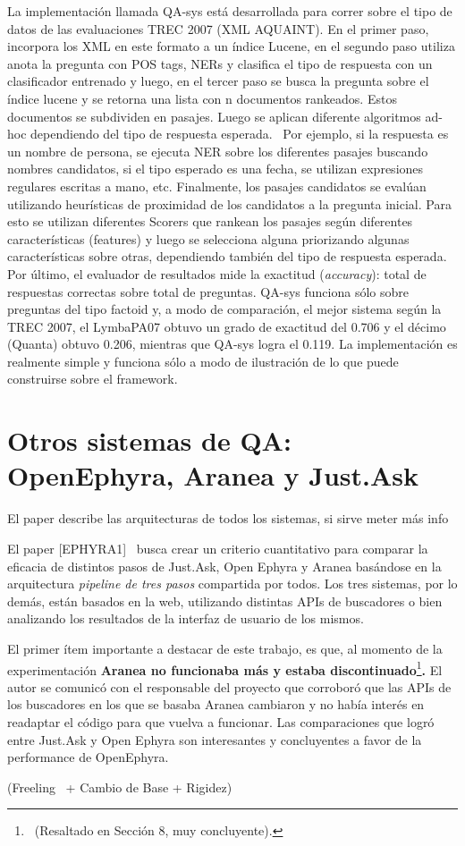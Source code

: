 La implementaci\'on llamada QA-sys est\'a desarrollada para correr sobre
el tipo de datos de las evaluaciones TREC 2007 (XML AQUAINT). En el
primer paso, incorpora los XML en este formato a un \'indice Lucene, en
el segundo paso utiliza anota la pregunta con POS tags, NERs y
clasifica el tipo de respuesta con un clasificador entrenado y luego,
en el tercer paso se busca la pregunta sobre el \'indice lucene y se
retorna una lista con n documentos rankeados. Estos documentos se
subdividen en pasajes. Luego se aplican diferente algoritmos ad-hoc
dependiendo del tipo de respuesta esperada. \ Por ejemplo, si la
respuesta es un nombre de persona, se ejecuta NER sobre los diferentes
pasajes buscando nombres candidatos, si el tipo esperado es una fecha,
se utilizan expresiones regulares escritas a mano, etc. Finalmente, los
pasajes candidatos se eval\'uan utilizando heur\'isticas de proximidad
de los candidatos a la pregunta inicial. Para esto se utilizan
diferentes Scorers que rankean los pasajes seg\'un diferentes
caracter\'isticas (features) y luego se selecciona alguna priorizando
algunas caracter\'isticas sobre otras, dependiendo tambi\'en del tipo
de respuesta esperada. Por \'ultimo, el evaluador de resultados mide la
exactitud (\textit{accuracy}): total de respuestas correctas sobre
total de preguntas. QA-sys funciona s\'olo sobre preguntas del tipo
factoid y, a modo de comparaci\'on, el mejor sistema seg\'un la TREC
2007, el LymbaPA07 obtuvo un grado de exactitud del 0.706 y el d\'ecimo
(Quanta) obtuvo 0.206, mientras que QA-sys logra el 0.119. La
implementaci\'on es realmente simple y funciona s\'olo a modo de
ilustraci\'on de lo que puede construirse sobre el framework. 

\bigskip

\section{Otros sistemas de QA: OpenEphyra, Aranea y Just.Ask}

\bigskip

El paper describe las arquitecturas de todos los sistemas, si sirve
meter m\'as info

El paper [EPHYRA1] \ busca crear un criterio cuantitativo para comparar
la eficacia de distintos pasos de Just.Ask, Open Ephyra y Aranea
bas\'andose en la arquitectura \textit{pipeline de tres pasos}
compartida por todos. Los tres sistemas, por lo dem\'as, est\'an
basados en la web, utilizando distintas APIs de buscadores o bien
analizando los resultados de la interfaz de usuario de los mismos. 

El primer \'item importante a destacar de este trabajo, es que, al
momento de la experimentaci\'on \textbf{Aranea no funcionaba m\'as y
estaba discontinuado}\footnote{\ (Resaltado en Secci\'on 8, muy
concluyente).\par }\textbf{. }El autor se comunic\'o con el responsable
del proyecto que corrobor\'o que las APIs de los buscadores en los que
se basaba Aranea cambiaron y no hab\'ia inter\'es en readaptar el
c\'odigo para que vuelva a funcionar. Las comparaciones que logr\'o
entre Just.Ask y Open Ephyra son interesantes y concluyentes a favor de
la performance de OpenEphyra. 

(Freeling \ + Cambio de Base + Rigidez)
